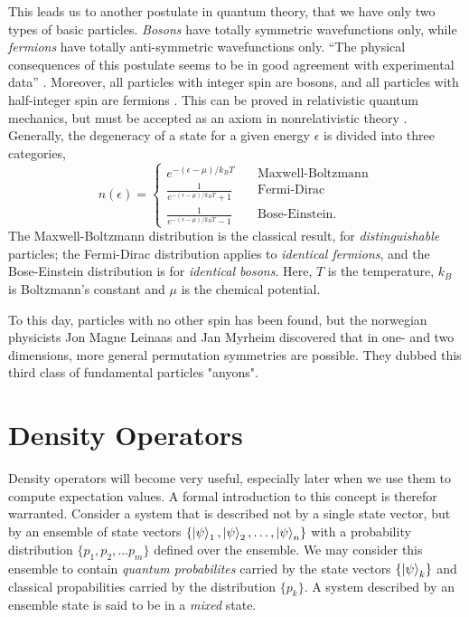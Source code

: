     This leads us to another postulate in quantum theory, that we have only two types of 
    basic particles. \emph{Bosons} have totally symmetric wavefunctions only, while 
    \emph{fermions} have totally anti-symmetric wavefunctions only. ``The physical 
    consequences of this postulate seems to be in good agreement with experimental data''
    \cite{leinaas1977theory}. Moreover, all particles with integer spin are bosons, 
    and all particles with half-integer spin are fermions
    \cite{fierz1939relativistische,pauli1940connection}. This can be proved in relativistic
    quantum mechanics, but must be accepted as an axiom in nonrelativistic 
    theory \cite{hilborn1995atoms}. Generally, the degeneracy of a state for a given 
    energy $\epsilon$ is divided into three categories,
    \begin{equation}
        n(\epsilon) = \begin{cases}
            e^{-(\epsilon - \mu)/k_BT} &\quad \text{Maxwell-Boltzmann} \\
            \frac{1}{e^{-(\epsilon - \mu)/k_BT} + 1} &\quad \text{Fermi-Dirac} \\
            \frac{1}{e^{-(\epsilon - \mu)/k_BT} - 1} &\quad \text{Bose-Einstein}.
        \end{cases}
    \end{equation}
    The Maxwell-Boltzmann distribution is the classical result, for \emph{distinguishable}
    particles; the Fermi-Dirac distribution applies to \emph{identical fermions}, and 
    the Bose-Einstein distribution is for \emph{identical bosons}. Here, $T$ is the 
    temperature, $k_B$ is Boltzmann's constant and $\mu$ is the chemical potential.

    To this day, particles with no other spin has been found, but the norwegian physicists
    Jon Magne Leinaas and Jan Myrheim discovered that in one- and two dimensions, more 
    general permutation symmetries are possible. They dubbed this third class of
    fundamental particles "anyons"\cite{leinaas1977theory}.

\section{Density Operators}

    Density operators will become very useful, especially later when we use them to compute 
    expectation values. A formal introduction to this concept is therefor warranted.
    Consider a system that is described not by 
    a single state vector, but by an ensemble of state vectors
    $\{\ket{\psi}_1, \ket{\psi}_2, \dots ,\ket{\psi}_n\}$ with a probability distribution 
    $\{p_1,p_2,\dots p_m \}$ defined over the ensemble. We may consider this ensemble to contain
    \emph{quantum probabilites} carried by the state vectors $\{\ket{\psi}_k \}$ and classical 
    propabilities carried by the distribution $\{p_k\}$. A system described by an ensemble 
    state is said to be in a \emph{mixed} state.

